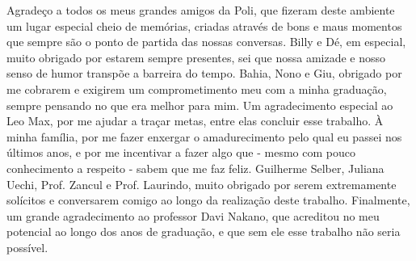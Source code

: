 \begin{agradecimentos}

Agradeço a todos os meus grandes amigos da Poli, que fizeram deste ambiente um lugar especial cheio de memórias, criadas através de bons e maus momentos que sempre são o ponto de partida das nossas conversas. Billy e Dé, em especial, muito obrigado por estarem sempre presentes, sei que nossa amizade e nosso senso de humor transpõe a barreira do tempo. Bahia, Nono e Giu, obrigado por me cobrarem e exigirem um comprometimento meu com a minha graduação, sempre pensando no que era melhor para mim. Um agradecimento especial ao Leo Max, por me ajudar a traçar metas, entre elas concluir esse trabalho. À minha família, por me fazer enxergar o amadurecimento pelo qual eu passei nos últimos anos, e por me incentivar a fazer algo que - mesmo com pouco conhecimento a respeito -  sabem que me faz feliz. Guilherme Selber, Juliana Uechi, Prof. Zancul e Prof. Laurindo, muito obrigado por serem extremamente solícitos e conversarem comigo ao longo da realização deste trabalho. Finalmente, um grande agradecimento ao professor Davi Nakano, que acreditou no meu potencial ao longo dos anos de graduação, e que sem ele esse trabalho não seria possível.

\end{agradecimentos}